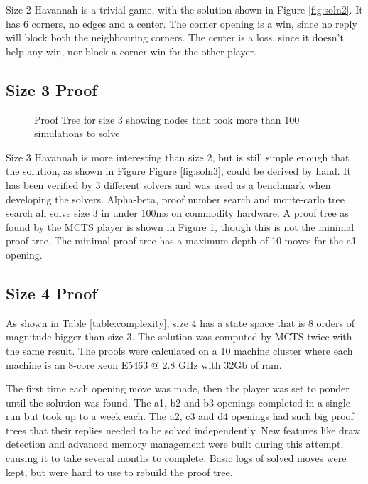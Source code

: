 Size 2 Havannah is a trivial game, with the solution shown in Figure \ref{fig:soln2}. It has 6 corners, no edges and a center. The corner opening is a win, since no reply will block both the neighbouring corners. The center is a loss, since it doesn't help any win, nor block a corner win for the other player.

\subsection{Size 3 Proof}

\begin{figure}
\centering

\caption{Proof Tree for size 3 showing nodes that took more than 100 simulations to solve}
\label{fig:proof3}
\end{figure}

Size 3 Havannah is more interesting than size 2, but is still simple enough that the solution, as shown in Figure Figure \ref{fig:soln3}, could be derived by hand. It has been verified by 3 different solvers and was used as a benchmark when developing the solvers. Alpha-beta, proof number search and monte-carlo tree search all solve size 3 in under 100ms on commodity hardware. A proof tree as found by the MCTS player is shown in Figure \ref{fig:proof3}, though this is not the minimal proof tree. The minimal proof tree has a maximum depth of 10 moves for the a1 opening.


\subsection{Size 4 Proof}

As shown in Table \ref{table:complexity}, size 4  has a state space that is 8 orders of magnitude bigger than size 3. The solution was computed by MCTS twice with the same result. The proofs were calculated on a 10 machine cluster where each machine is an 8-core xeon E5463 @ 2.8 GHz with 32Gb of ram.

The first time each opening move was made, then the player was set to ponder until the solution was found. The a1, b2 and b3 openings completed in a single run but took up to a week each. The a2, c3 and d4 openings had such big proof trees that their replies needed to be solved independently. New features like draw detection and advanced memory management were built during this attempt, causing it to take several months to complete. Basic logs of solved moves were kept, but were hard to use to rebuild the proof tree.

